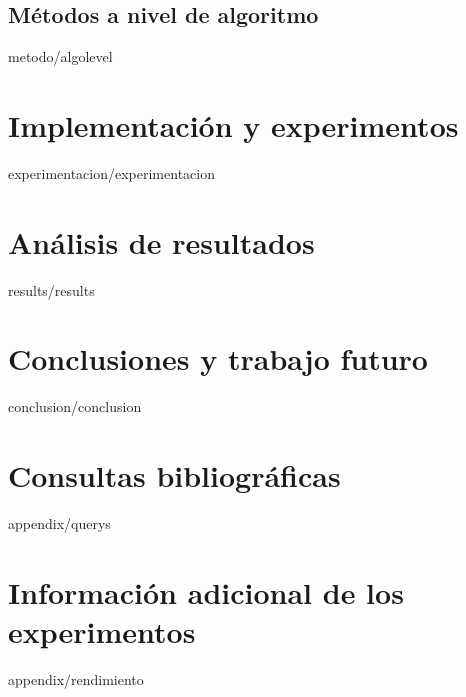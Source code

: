 \documentclass[epsbased,copyright,final,printable,covers,extendedindex,firstnumbered,tfg,gnuplot]{tfgtfmthesisuam}
\begin{document}
    \section{Métodos a nivel de algoritmo\label{SEC:ALGOLEVEL}}{metodo/algolevel}


\chapter{Implementación y experimentos\label{CAP:EXPERIMENTACION}}{experimentacion/experimentacion}

\chapter{Análisis de resultados\label{CAP:RESULTS}}{results/results}

\chapter{Conclusiones y trabajo futuro\label{CAP:CONCLUSION}}{conclusion/conclusion}



\appendix

\chapter{Consultas bibliográficas\label{AP:QUERYS}}{appendix/querys}

\chapter{Información adicional de los experimentos\label{AP:RENDIMIENTO}}{appendix/rendimiento}

\end{document}
